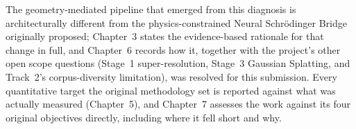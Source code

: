 The geometry-mediated pipeline that emerged from this diagnosis is architecturally different from the physics-constrained Neural Schr\"{o}dinger Bridge originally proposed; Chapter~3 states the evidence-based rationale for that change in full, and Chapter~6 records how it, together with the project's other open scope questions (Stage~1 super-resolution, Stage~3 Gaussian Splatting, and Track~2's corpus-diversity limitation), was resolved for this submission. Every quantitative target the original methodology set is reported against what was actually measured (Chapter~5), and Chapter~7 assesses the work against its four original objectives directly, including where it fell short and why.
